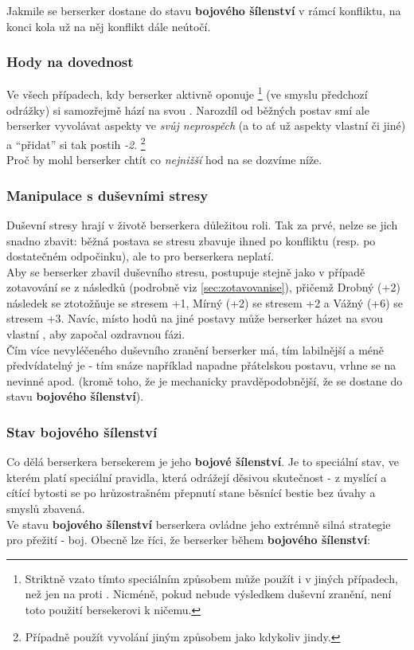 \documentclass[../main.tex]{subfiles}
\begin{document}
Jakmile se berserker dostane do stavu \textbf{bojového šílenství} v rámcí konfliktu, na konci kola už na něj konflikt dále neútočí.
\subsubsection*{Hody na dovednost }
Ve všech případech, kdy berserker aktivně oponuje   \footnote{Striktně vzato tímto speciálním způsobem může použít  i v jiných případech, než jen na  proti . Nicméně, pokud nebude výsledkem duševní zranění, není toto použití bersekerovi k ničemu.} (ve smyslu předchozí odrážky) si samozřejmě hází na  svou . Narozdíl od běžných postav smí ale berserker vyvolávat aspekty ve \textit{svůj neprospěch} (a to ať už aspekty vlastní či jiné) a ``přidat'' si tak postih \textit{-2}. \footnote{Případně použít vyvolání jiným způsobem jako kdykoliv jindy.}\\
Proč by mohl berserker chtít co \textit{nejnižší} hod na  se dozvíme níže.

\subsubsection*{Manipulace s duševními stresy}
Duševní stresy hrají v životě berserkera důležitou roli. Tak za prvé, nelze se jich snadno zbavit: běžná postava se stresu zbavuje ihned po konfliktu (resp. po dostatečném odpočinku), ale to pro berserkera neplatí. \\
Aby se berserker zbavil duševního stresu, postupuje stejně jako v případě zotavování se z následků (podrobně viz \ref{sec:zotavovanise}), přičemž Drobný (+2) následek se ztotožňuje se stresem +1, Mírný (+2) se stresem +2 a Vážný (+6) se stresem +3. Navíc, místo hodů na  jiné postavy může berserker házet na svou vlastní , aby započal ozdravnou fázi.\\
Čím více nevyléčeného duševního zranění berserker má, tím labilnější a méně předvídatelný je - tím snáze například napadne přátelskou postavu, vrhne se na nevinné apod. (kromě toho, že je mechanicky pravděpodobnější, že se dostane do stavu \textbf{bojového šílenství}).

\subsubsection*{Stav bojového šílenství}
Co dělá berserkera bersekerem je jeho \textbf{bojové šílenství}. Je to speciální stav, ve kterém platí speciální pravidla, která odrážejí děsivou skutečnost - z myslící a cítící bytosti se po hrůzostrašném přepnutí stane běsnící bestie bez úvahy a smyslů zbavená. \\
Ve stavu \textbf{bojového šílenství} berserkera ovládne jeho extrémně silná strategie pro přežití - boj. Obecně lze říci, že berserker během \textbf{bojového šílenství}:
\end{document}
